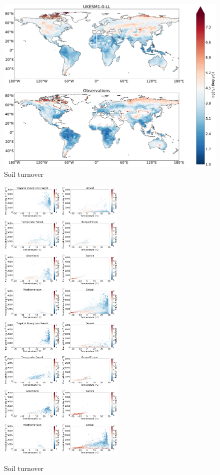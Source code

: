 \documentclass[bg, manuscript]{copernicus}
\begin{document}
\begin{figure}[t]
    \includegraphics[width=12cm]{figs/Turnover/soil_tau_map_comparison.pdf}
    \caption{Soil turnover \label{fig:SoilTurnoverlMap}}
\end{figure}

\begin{figure}[t]
    \includegraphics[width=6cm]{figs/Turnover/soil_UKESM_colouredbytau_biome_log.pdf}
    \includegraphics[width=6cm]{figs/Turnover/soil_obs1_colouredbytau_biome.pdf}
    \caption{Soil turnover \label{fig:EcoTurnoverlScatter}}
\end{figure}
\end{document}
